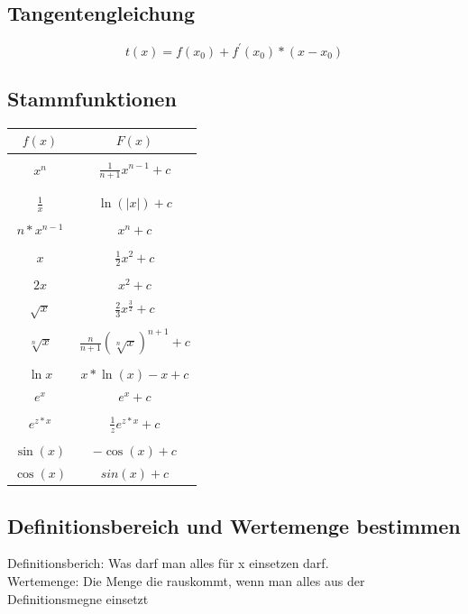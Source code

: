 \documentclass[12pt,a4paper]{article}
\begin{document}
	\subsection{Tangentengleichung}
		$$t(x) = f(x_{0}) +f^{'}(x_{0})*(x-x_{0})$$

	\subsection{Stammfunktionen}
			\begin{tabular}{c|c}
				 \hline
				$f(x)$ & $F(x)$ \\
				\hline\\
				$x^{n}$ & $\frac{1}{n+1}x^{n-1}+c$ \\\\
				\hline\\
				$\frac{1}{x}$ & $\ln{(|x|)}+c$ \\\\
				\hline
				$n*x^{n-1}$ & $x^n + c$\\
				\hline\\
				$x$ & $\frac{1}{2}x^2+c$\\\\
				\hline
				$2x$ & $x^2+c$\\
				\hline
				$\sqrt{x}$ & $\frac{2}{3}x^{\frac{3}{2}} + c$\\
				\hline\\
				$\sqrt[n]{x}$ & $\frac{n}{n+1}(\sqrt[n]{x})^{n+1} + c$\\\\
				\hline
				$\ln{x}$ & $x*\ln{(x)} -x + c$\\
				\hline
				$e^x$ & $e^x + c$\\
				\hline\\
				$e^{z*x}$ & $\frac{1}{z}e^{z*x} + c$\\\\
				\hline
				$\sin{(x)}$ & $-\cos{(x)}+ c$\\
				\hline
				$\cos{(x)}$ & $sin{(x)} + c$\\
			\end{tabular}

	\subsection{Definitionsbereich und Wertemenge bestimmen}
		Definitionsberich: Was darf man alles für x einsetzen darf. \\
		Wertemenge: Die Menge die rauskommt, wenn man alles aus der Definitionsmegne einsetzt
\end{document}
